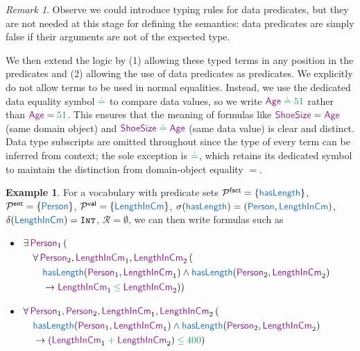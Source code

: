 \documentclass[11pt]{amsart}
\theoremstyle{definition}
\newtheorem{example}{Example}
\theoremstyle{remark}
\newtheorem{remark}[theorem]{Remark}
\newcommand{\Preds}{\mathcal{P}}
\newcommand{\EntPreds}{\Preds^{\textsf{ent}}}
\newcommand{\ValPreds}{\Preds^{\textsf{val}}}
\newcommand{\FactPreds}{\Preds^{\textsf{fact}}}
\newcommand{\RefSchemes}{\mathcal{R}}
\newcommand{\pr}[1]{\mathsf{\textcolor{RoyalBlue}{#1}}}
\newcommand{\var}[1]{\mathsf{\textcolor{Plum}{#1}}}
\newcommand{\tp}[1]{\texttt{\textsc{#1}}}
\newcommand{\dataOp}[1]{\mathbin{\textcolor{ForestGreen}{#1}}}
\newcommand{\dataVal}[1]{\textcolor{ForestGreen}{#1}}
\newcommand{\dataEq}{\mathrel{\textcolor{ForestGreen}{\doteq}}}
\begin{document}
\begin{remark}
Observe we could introduce typing rules for data predicates, but they are not needed at this stage for defining the semantics: data predicates are simply false if their arguments are not of the expected type.
\end{remark}

We then extend the logic by (1) allowing these typed terms in any position in the predicates and (2) allowing the use of data predicates as predicates. We explicitly do not allow terms to be used in normal equalities. Instead, we use the dedicated data equality symbol $\dataEq$ to compare data values, so we write $\var{Age} \dataEq \dataVal{51}$ rather than $\var{Age} = \dataVal{51}$. This ensures that the meaning of formulas like $\var{ShoeSize} = \var{Age}$ (same domain object) and $\var{ShoeSize} \dataEq \var{Age}$ (same data value) is clear and distinct. Data type subscripts are omitted throughout since the type of every term can be inferred from context; the sole exception is $\dataEq$, which retains its dedicated symbol to maintain the distinction from domain-object equality $=$.

\begin{example}
For a vocabulary with predicate sets $\FactPreds = \{ \pr{hasLength} \}$, $\EntPreds = \{ \pr{Person} \}$, $\ValPreds = \{ \pr{LengthInCm} \}$, $\sigma(\pr{hasLength}) = (\pr{Person}, \pr{LengthInCm})$, $\delta(\pr{LengthInCm}) = \tp{Int}$, $\RefSchemes = \emptyset$, we can then write formulas such as
\begin{itemize}
  \item $\begin{aligned}[t]
    &\exists \, \var{Person}_1 \, ( \\
    &\quad \forall \, \var{Person}_2, \var{LengthInCm}_1, \var{LengthInCm}_2 \, ( \\
    &\quad \quad \pr{hasLength}(\var{Person}_1, \var{LengthInCm}_1) \wedge \pr{hasLength}(\var{Person}_2, \var{LengthInCm}_2) \\
    &\quad \quad \to \var{LengthInCm}_1 \dataOp{\leq} \var{LengthInCm}_2 ))
    \end{aligned}$
  \item $\begin{aligned}[t]
    &\forall \, \var{Person}_1, \var{Person}_2, \var{LengthInCm}_1, \var{LengthInCm}_2 \, ( \\
    &\quad \pr{hasLength}(\var{Person}_1, \var{LengthInCm}_1) \wedge \pr{hasLength}(\var{Person}_2, \var{LengthInCm}_2) \\
    &\quad \to (\var{LengthInCm}_1 \dataOp{+} \var{LengthInCm}_2) \dataOp{\leq} \dataVal{400})
    \end{aligned}$
\end{itemize}
\end{example}
\end{document}
